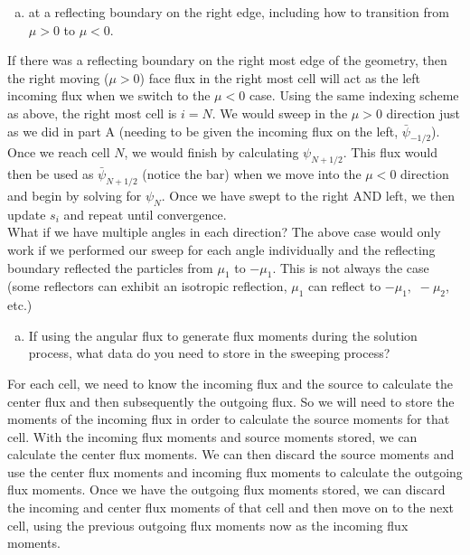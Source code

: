 \documentclass[10pt]{article}
\begin{document}
%
%
%

\vspace{10pt}
\begin{enumerate}[(c)]
\item at a reflecting boundary on the right edge, including how to transition from $\mu > 0$ to $\mu < 0$.
\end{enumerate}

If there was a reflecting boundary on the right most edge of the geometry, then the right moving ($\mu>0$) face flux in the right most cell will act as the left incoming flux when we switch to the $\mu < 0$ case. Using the same indexing scheme as above, the right most cell is $i=N$. We would sweep in the $\mu >0$ direction just as we did in part A (needing to be given the incoming flux on the left, $\bar{\psi}_{-1/2}$). Once we reach cell $N$, we would finish by calculating $\psi_{N+1/2}$. This flux would then be used as $\bar{\psi}_{N+1/2}$ (notice the bar) when we move into the $\mu<0$ direction and begin by solving for $\psi_N$. Once we have swept to the right AND left, we then update $s_i$ and repeat until convergence.\\

What if we have multiple angles in each direction? The above case would only work if we performed our sweep for each angle individually and the reflecting boundary reflected the particles from $\mu_1$ to $-\mu_1$. This is not always the case (some reflectors can exhibit an isotropic reflection, $\mu_1$ can reflect to $-\mu_1,\,\,-\mu_2$, etc.)

%
%
%

\vspace{10pt}
\begin{enumerate}[(d)]
\item If using the angular flux to generate flux moments during the solution process, what data do you need to store in the sweeping process?
\end{enumerate}

For each cell, we need to know the incoming flux and the source to calculate the center flux and then subsequently the outgoing flux. So we will need to store the moments of the incoming flux in order to calculate the source moments for that cell. With the incoming flux moments and source moments stored, we can calculate the center flux moments. We can then discard the source moments and use the center flux moments and incoming flux moments to calculate the outgoing flux moments. Once we have the outgoing flux moments stored, we can discard the incoming and center flux moments of that cell and then move on to the next cell, using the previous outgoing flux moments now as the incoming flux moments.\\
\end{document}
